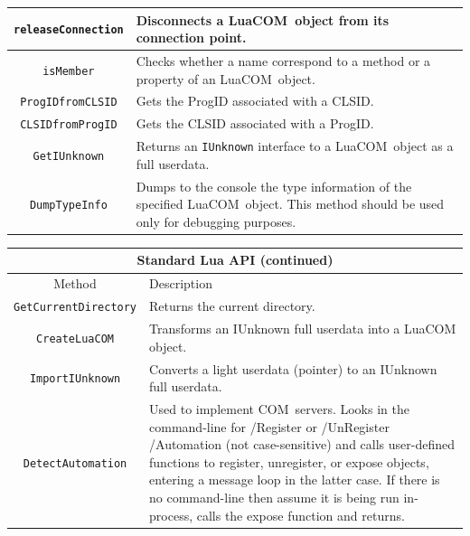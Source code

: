 \documentclass[11pt,a4paper,english]{report}
\newcommand{\ttext}[1]{#1}
\newcommand{\ttitle}[1]{#1}
\newcommand{\tlinetitB}[2]{#1 & #2 \\ \hline \hline}
\newcommand{\ttext}[1]{{\raggedright #1 \\}}
\newcommand{\ttitle}[1]{\begin{minipage}{\colA cm} \centering \bf #1 \end{minipage}}
\newcommand{\tlinetitB}[2]{\ttitle{#1} & \ttitle{#2} \\ \hline \hline}
\newcommand{\ident}[1]{\mbox{\texttt{#1}}}
\newcommand{\techname}[1]{\mbox{#1}}
\newcommand{\com}{\techname{COM}}
\newcommand{\luacom}{\techname{LuaCOM}}
\begin{document}
\begin{center}
\begin{tabular}{|c|p{7cm}|}
  \verb+releaseConnection+
    & \ttext{Disconnects a \luacom\ object from its
    connection point.} \\ \hline

  \verb+isMember+
    & \ttext{Checks whether a name correspond to a method
    or a property of an \luacom\ object.} \\ \hline

  \verb+ProgIDfromCLSID+
    & \ttext{Gets the ProgID associated with a CLSID.} \\ \hline

  \verb+CLSIDfromProgID+
    & \ttext{Gets the CLSID associated with a ProgID.} \\ \hline

  \verb+GetIUnknown+
    & \ttext{Returns an \ident{IUnknown} interface to a \luacom\
    object as a full userdata.} \\ \hline

  \verb+DumpTypeInfo+ & \ttext{Dumps to the console the type
    information of the specified \luacom\ object. This method should
    be used only for debugging purposes.} \\ \hline

  \end{tabular}
  \end{center}

  \begin{center}
  \begin{tabular}{|c|p{7cm}|}

  \multicolumn{2}{c}{\large Standard Lua API (continued)} \\
  \hline

  \tlinetitB{Method}{Description}

  \verb+GetCurrentDirectory+ & \ttext{Returns the current directory.} \\ \hline

  \verb+CreateLuaCOM+ & \ttext{Transforms an IUnknown full userdata
  into a LuaCOM object.} \\ \hline

  \verb+ImportIUnknown+ & \ttext{Converts a light userdata (pointer)
  to an IUnknown full userdata.} \\ \hline

  \verb+DetectAutomation+ & \ttext{Used to implement \com\ servers.
  Looks in the command-line for /Register or /UnRegister /Automation (not case-sensitive)
  and calls user-defined functions to register, unregister, or expose objects, entering
  a message loop in the latter case. If there is no command-line then assume it is being
  run in-process, calls the expose function and returns.
  } \\ \hline

  \end{tabular}
  \end{center}
\end{document}
